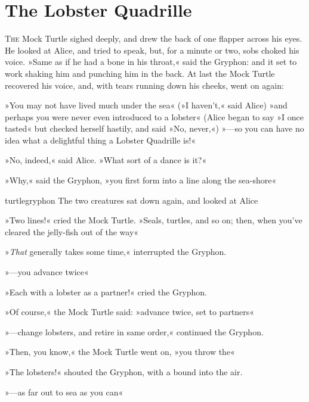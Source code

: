 \chapter{The Lobster Quadrille}

\lettrine[lines=4,findent=2pt]{T}{he} Mock Turtle sighed deeply, and drew the back of one flapper across his eyes. He looked at Alice, and tried to speak, but, for a minute or two, sobs choked his voice. »Same as if he had a bone in his throat,« said the Gryphon: and it set to work shaking him and punching him in the back. At last the Mock Turtle recovered his voice, and, with tears running down his cheeks, went on again:

»You may not have lived much under the sea\longdash« (»I haven't,« said Alice) »and perhaps you were never even introduced to a lobster\longdash« (Alice began to say »I once tasted\longdash« but checked herself hastily, and said »No, never,«) »—so you can have no idea what a delightful thing a Lobster Quadrille is!«

»No, indeed,« said Alice. »What sort of a dance is it?«

»Why,« said the Gryphon, »you first form into a line along the sea-shore\longdash«

\begin{pictures}
	\begin{colorbigpic}
		[1.1]
		{turtlegryphon}
		{The two creatures sat down again, and looked at Alice}
	\end{colorbigpic}
\end{pictures}


»Two lines!« cried the Mock Turtle. »Seals, turtles, and so on; then, when you've cleared the jelly-fish out of the way\longdash«

»\textit{That} generally takes some time,« interrupted the Gryphon.

»—you advance twice\longdash«

»Each with a lobster as a partner!« cried the Gryphon.

»Of course,« the Mock Turtle said: »advance twice, set to partners\longdash«

»—change lobsters, and retire in same order,« continued the Gryphon.

»Then, you know,« the Mock Turtle went on, »you throw the\longdash«

»The lobsters!« shouted the Gryphon, with a bound into the air.

»—as far out to sea as you can\longdash«

